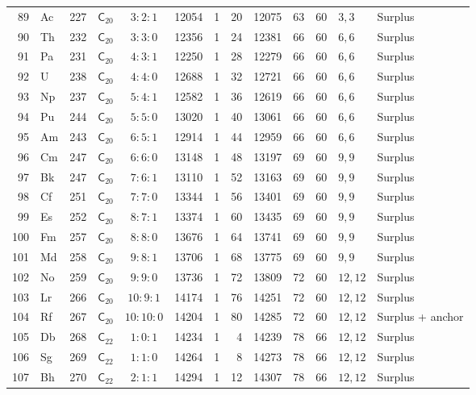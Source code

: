 {\begin{longtable}{@{}rllccrrrrrrll@{}}
89 & Ac & 227 & $\mathsf{C}_{20}$ & $3:2:1$ & 12054 & 1 & 20 & 12075 & 63 & 60 & $3,3$ & Surplus\\
90 & Th & 232 & $\mathsf{C}_{20}$ & $3:3:0$ & 12356 & 1 & 24 & 12381 & 66 & 60 & $6,6$ & Surplus\\
91 & Pa & 231 & $\mathsf{C}_{20}$ & $4:3:1$ & 12250 & 1 & 28 & 12279 & 66 & 60 & $6,6$ & Surplus\\
92 & U & 238 & $\mathsf{C}_{20}$ & $4:4:0$ & 12688 & 1 & 32 & 12721 & 66 & 60 & $6,6$ & Surplus\\
93 & Np & 237 & $\mathsf{C}_{20}$ & $5:4:1$ & 12582 & 1 & 36 & 12619 & 66 & 60 & $6,6$ & Surplus\\
94 & Pu & 244 & $\mathsf{C}_{20}$ & $5:5:0$ & 13020 & 1 & 40 & 13061 & 66 & 60 & $6,6$ & Surplus\\
95 & Am & 243 & $\mathsf{C}_{20}$ & $6:5:1$ & 12914 & 1 & 44 & 12959 & 66 & 60 & $6,6$ & Surplus\\
96 & Cm & 247 & $\mathsf{C}_{20}$ & $6:6:0$ & 13148 & 1 & 48 & 13197 & 69 & 60 & $9,9$ & Surplus\\
97 & Bk & 247 & $\mathsf{C}_{20}$ & $7:6:1$ & 13110 & 1 & 52 & 13163 & 69 & 60 & $9,9$ & Surplus\\
98 & Cf & 251 & $\mathsf{C}_{20}$ & $7:7:0$ & 13344 & 1 & 56 & 13401 & 69 & 60 & $9,9$ & Surplus\\
99 & Es & 252 & $\mathsf{C}_{20}$ & $8:7:1$ & 13374 & 1 & 60 & 13435 & 69 & 60 & $9,9$ & Surplus\\
100 & Fm & 257 & $\mathsf{C}_{20}$ & $8:8:0$ & 13676 & 1 & 64 & 13741 & 69 & 60 & $9,9$ & Surplus\\
101 & Md & 258 & $\mathsf{C}_{20}$ & $9:8:1$ & 13706 & 1 & 68 & 13775 & 69 & 60 & $9,9$ & Surplus\\
102 & No & 259 & $\mathsf{C}_{20}$ & $9:9:0$ & 13736 & 1 & 72 & 13809 & 72 & 60 & $12,12$ & Surplus\\
103 & Lr & 266 & $\mathsf{C}_{20}$ & $10:9:1$ & 14174 & 1 & 76 & 14251 & 72 & 60 & $12,12$ & Surplus\\
104 & Rf & 267 & $\mathsf{C}_{20}$ & $10:10:0$ & 14204 & 1 & 80 & 14285 & 72 & 60 & $12,12$ & Surplus + anchor\\
105 & Db & 268 & $\mathsf{C}_{22}$ & $1:0:1$ & 14234 & 1 & 4 & 14239 & 78 & 66 & $12,12$ & Surplus\\
106 & Sg & 269 & $\mathsf{C}_{22}$ & $1:1:0$ & 14264 & 1 & 8 & 14273 & 78 & 66 & $12,12$ & Surplus\\
107 & Bh & 270 & $\mathsf{C}_{22}$ & $2:1:1$ & 14294 & 1 & 12 & 14307 & 78 & 66 & $12,12$ & Surplus\\

\end{longtable}}
